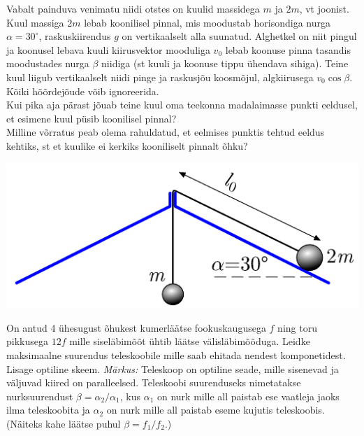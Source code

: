 \documentclass[10pt]{article}
\begin{document}

Vabalt painduva venimatu niidi otstes on kuulid massidega $m$ ja $2m$, vt joonist. Kuul massiga $2m$ lebab koonilisel pinnal, mis moodustab horisondiga nurga $\alpha=30^\circ$, raskuskiirendus $g$ on vertikaalselt alla suunatud. Alghetkel on niit pingul ja koonusel lebava kuuli kiirusvektor mooduliga $v_0$ lebab koonuse pinna tasandis moodustades nurga $\beta$ niidiga (st kuuli ja koonuse tippu ühendava sihiga). Teine kuul liigub vertikaalselt niidi pinge ja raskusjõu koosmõjul, algkiirusega $v_0\cos\beta$. Kõiki hõõrdejõude võib ignoreerida.\\
	\osa Kui pika aja pärast  jõuab teine kuul oma teekonna madalaimasse punkti eeldusel, et esimene kuul püsib koonilisel pinnal?\\
	\osa Milline võrratus peab olema rahuldatud, et eelmises punktis tehtud eeldus kehtiks, st et kuulike ei kerkiks kooniliselt pinnalt õhku?
	
	\begin{center}
		\vspace{-13pt}
		\includegraphics[width=0.55\linewidth]{2020-lahg-10-yl.pdf}
	\end{center}
\probend
\bigskip

\setAuthor{}

On antud 4 ühesugust õhukest kumerläätse fookuskaugusega $f$ ning toru pikkusega $12f$ mille siseläbimõõt ühtib läätse välisläbimõõduga. Leidke maksimaalne suurendus teleskoobile mille saab ehitada nendest komponetidest. Lisage optiline skeem. 
\emph{Märkus:} Teleskoop on optiline seade, mille sisenevad ja väljuvad kiired on paralleelsed. Teleskoobi suurenduseks nimetatakse nurksuurendust $ \beta = {\alpha}_{2} / {\alpha}_{1}$, kus $\alpha_1$ on nurk mille all paistab ese vaatleja jaoks ilma teleskoobita ja $\alpha_2$ on nurk mille all paistab eseme kujutis teleskoobis. (Näiteks kahe läätse puhul $ \beta = f_1 / f_2 $.)
\probend
\bigskip

\setAuthor{}
\end{document}
